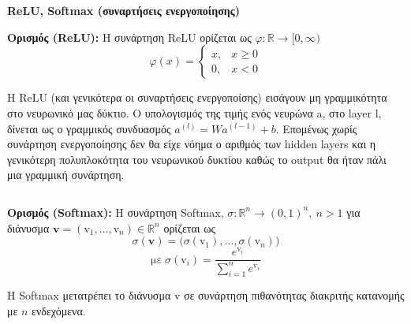 \documentclass[a4paper,12pt]{article}
\begin{document}


\newpage


\section*{}
\begin{center}
    \Large \textbf{ReLU, Softmax (συναρτήσεις ενεργοποίησης)}
\end{center}

\textbf{Ορισμός (ReLU):} Η συνάρτηση ReLU ορίζεται ως $φ: \mathbb{R} \to [0,\infty)$  
\[
φ(x) =
\begin{cases} 
x, & x \geq 0 \\
0, & x < 0
\end{cases}
\]

Η ReLU (και γενικότερα οι συναρτήσεις ενεργοποίσης) εισάγουν μη γραμμικότητα στο νευρωνικό μας δύκτιο. Ο υπολογισμός της τιμής ενός νευρώνα a, στο layer l, δίνεται ως ο γραμμικός συνδυασμός $a^{(l)} = Wa^{(l-1)} + b$. Επομένως χωρίς συνάρτηση ενεργοποίησης δεν θα είχε νόημα ο αριθμός των hidden layers και η γενικότερη πολυπλοκότητα του νευρωνικού δυκτίου καθώς το output θα ήταν πάλι μια γραμμική συνάρτηση.

$$$$

\textbf{Ορισμός (Softmax):} Η συνάρτηση Softmax, $σ: \mathbb{R}^n \to (0,1)^n , \ n>1$ για διάνυσμα $\mathbf{v} = (\mathrm{v}_1, \dots, \mathrm{v}_n) \in \mathbb{R}^n$ ορίζεται ως 
$$
σ(\mathbf{v}) = \big(σ(\mathrm{v}_1), \dots , σ(\mathrm{v}_n) \big)
$$
$$
\text{με} \ σ(\mathrm{v}_i) = \frac{e^{\mathrm{v}_i}}{\sum_{i=1}^n e^{\mathrm{v}_i}} 
$$

Η Softmax μετατρέπει το διάνυσμα $\mathrm{v}$ σε συνάρτηση πιθανότητας διακριτής κατανομής με $n$ ενδεχόμενα.

\end{document}
